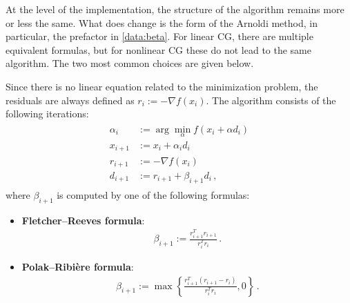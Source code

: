     At the level of the implementation, the structure of the algorithm remains more or less the same. What does change is the form of the Arnoldi method, in particular, the prefactor in \cref{data:beta}. For linear CG, there are multiple equivalent formulas, but for nonlinear CG these do not lead to the same algorithm. The two most common choices are given below.
    \begin{method}[Nonlinear CG]
        Since there is no linear equation related to the minimization problem, the residuals are always defined as $r_i:=-\nabla f(x_i)$. The algorithm consists of the following iterations:
        \begin{gather}
            \begin{aligned}
                \alpha_i &:= \arg\min_\alpha f(x_i+\alpha d_i)\label{data:argmin}\\
                x_{i+1} &:= x_i+\alpha_id_i\\
                r_{i+1} &:= -\nabla f(x_i)\\
                d_{i+1} &:= r_{i+1}+\beta_{i+1}d_i\,,
            \end{aligned}
        \end{gather}
        where $\beta_{i+1}$ is computed by one of the following formulas:
        \begin{itemize}
            \item \textbf{Fletcher--Reeves formula}:
                \begin{gather}
                    \beta_{i+1} := \frac{r_{i+1}^Tr_{i+1}}{r_i^Tr_i}\,.
                \end{gather}
            \item \textbf{Polak--Ribi\`ere formula}:
                \begin{gather}
                    \label{data:polak_ribiere}
                    \beta_{i+1} := \max\left\{\frac{r_{i+1}^T(r_{i+1}-r_i)}{r_i^Tr_i}, 0\right\}\,.
                \end{gather}
        \end{itemize}
    \end{method}


